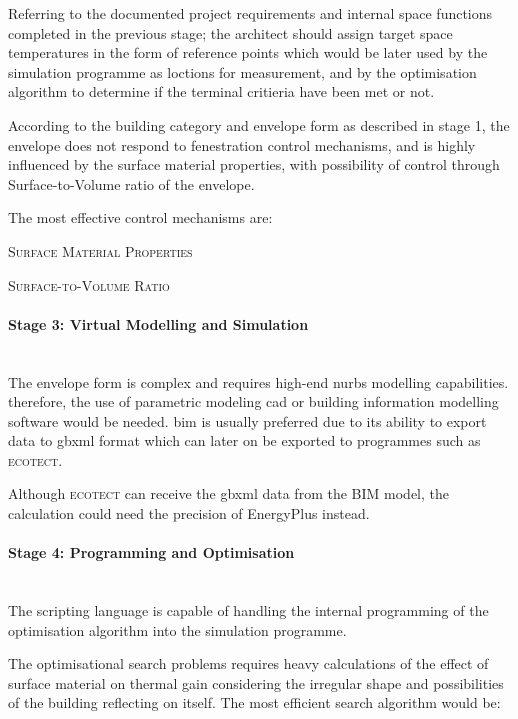 Referring to the documented project requirements and internal space functions completed in the previous stage; the architect should assign target space temperatures in the form of reference points which would be later used by the simulation programme as loctions for measurement, and by the optimisation algorithm to determine if the terminal critieria have been met or not.

According to the building category and envelope form as described in stage 1, the envelope does not respond to fenestration control mechanisms, and is highly influenced by the surface material properties, with possibility of control through Surface-to-Volume ratio of the envelope.

The most effective control mechanisms are:

\begin{compactenum}
	\item \textsc{Surface Material Properties}
	\item \textsc{Surface-to-Volume Ratio}
\end{compactenum}

\paragraph{Stage 3: Virtual Modelling and Simulation}\mbox{}\\

The envelope form is complex and requires high-end nurbs modelling capabilities. therefore, the use of parametric modeling cad or building information modelling software would be needed. bim is usually preferred due to its ability to export data to gbxml format which can later on be exported to programmes such as \textsc{ecotect}.

Although \textsc{ecotect} can receive the gbxml data from the BIM model, the calculation could need the precision of EnergyPlus instead.

\paragraph{Stage 4: Programming and Optimisation}\mbox{}\\

The scripting language is capable of handling the internal programming of the optimisation algorithm into the simulation programme.

The optimisational search problems requires heavy calculations of the effect of surface material on thermal gain considering the irregular shape and possibilities of the building reflecting on itself. The most efficient search algorithm would be:

